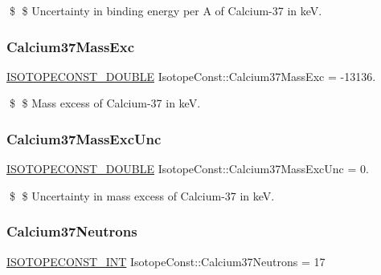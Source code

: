 \$ \$ Uncertainty in binding energy per A of Calcium-\/37 in keV. \mbox{\label{group___isotope_const-_calcium-_ca37_ga4c6621353fb25f28d7d4fa3c7e475a0e}} 
\subsubsection{\texorpdfstring{Calcium37\+Mass\+Exc}{Calcium37MassExc}}
{\footnotesize\ttfamily \mbox{\hyperlink{group___isotope_const-_macros_ga8f45a7272ce02c0b4c65c44636ed719a}{I\+S\+O\+T\+O\+P\+E\+C\+O\+N\+S\+T\+\_\+\+D\+O\+U\+B\+LE}} Isotope\+Const\+::\+Calcium37\+Mass\+Exc = -\/13136.}

\$ \$ Mass excess of Calcium-\/37 in keV. \mbox{\label{group___isotope_const-_calcium-_ca37_ga112b63f40b219d2e5c1dca583a9d16b3}} 
\subsubsection{\texorpdfstring{Calcium37\+Mass\+Exc\+Unc}{Calcium37MassExcUnc}}
{\footnotesize\ttfamily \mbox{\hyperlink{group___isotope_const-_macros_ga8f45a7272ce02c0b4c65c44636ed719a}{I\+S\+O\+T\+O\+P\+E\+C\+O\+N\+S\+T\+\_\+\+D\+O\+U\+B\+LE}} Isotope\+Const\+::\+Calcium37\+Mass\+Exc\+Unc = 0.}

\$ \$ Uncertainty in mass excess of Calcium-\/37 in keV. \mbox{\label{group___isotope_const-_calcium-_ca37_gaea0e74223f963072ef58416a4a037bf6}} 
\subsubsection{\texorpdfstring{Calcium37\+Neutrons}{Calcium37Neutrons}}
{\footnotesize\ttfamily \mbox{\hyperlink{group___isotope_const-_macros_ga5f18360b3e99483a35c32d789e62621c}{I\+S\+O\+T\+O\+P\+E\+C\+O\+N\+S\+T\+\_\+\+I\+NT}} Isotope\+Const\+::\+Calcium37\+Neutrons = 17}

